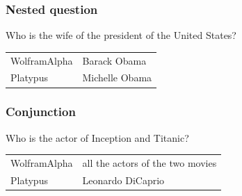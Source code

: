 \begin{frame}
    \frametitle{Nested question}

Who is the wife of the president of the United States?
    \begin{tabular}{ll}
        \alert{WolframAlpha} & Barack Obama\\
        \alert{Platypus} & Michelle Obama\\
    \end{tabular}

    \medbreak

\end{frame}

\begin{frame}
    \frametitle{Conjunction}

Who is the actor of Inception and Titanic?
    \begin{tabular}{ll}
        \alert{WolframAlpha} & all the actors of the two movies\\
        \alert{Platypus} & Leonardo DiCaprio\\
    \end{tabular}
\end{frame}